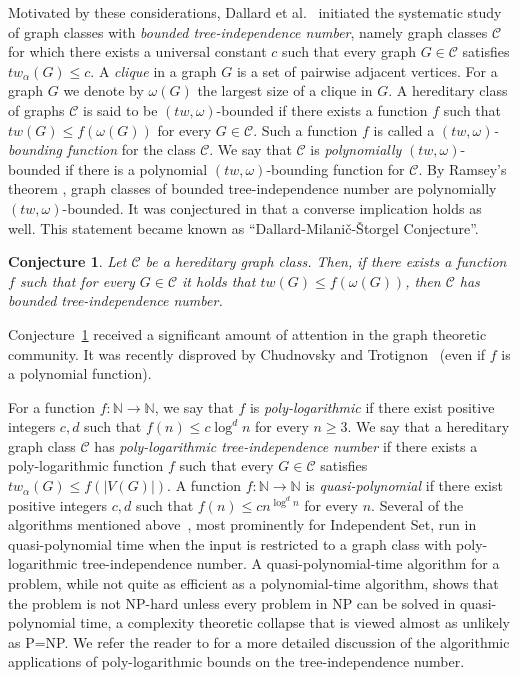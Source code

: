 \documentclass[11pt]{amsart}
\newtheorem{conjecture}{Conjecture}[section]
\newcommand{\cal}{\mathcal}
\newcommand{\tw}{tw\xspace}
\newcommand{\atw}{tw_{\alpha}\xspace}
\begin{document}
Motivated by these considerations, Dallard et al.~\cite{dms3} initiated the systematic study of graph classes with {\em bounded tree-independence number}, namely graph classes ${\cal C}$ for which there exists a universal constant $c$ such that every graph $G \in {\cal C}$ satisfies $\atw(G) \leq c$. 
A {\em clique} in a graph $G$ is a set of pairwise adjacent vertices.
For a graph $G$ we denote by $\omega(G)$ the largest size of a clique in $G$.
A hereditary class of graphs $\cal C$ is said to be
$(\tw, \omega)$-bounded if there exists a function $f$ such that
$\tw(G) \leq  f(\omega(G))$ for every  $G \in \cal C$.
Such a function $f$ is called a 
{\em $(\tw,\omega)$-bounding function} for the class $\mathcal{C}$.
We say that $\mathcal{C}$ is {\em polynomially} $(\tw,\omega)$-bounded if
there is a polynomial $(\tw,\omega)$-bounding  function for $\mathcal{C}$.
By Ramsey's theorem \cite{Ramsey}, graph classes of bounded tree-independence number are polynomially $(\tw,\omega )$-bounded. It was conjectured in \cite{dms3} that a converse implication holds as well.  This statement became known as
``Dallard-Milani\v{c}-{\v{S}}torgel Conjecture''.
%
\begin{conjecture}\label{Milanic}
  Let $\cal C$ be a hereditary graph class. Then, if there exists a function $f$ such that for every $G \in {\cal C}$ it holds that $\tw(G) \leq f(\omega(G))$, then ${\cal C}$ has bounded tree-independence number.
 \end{conjecture} 
%
Conjecture~\ref{Milanic} received a significant amount of attention in the graph theoretic community. 
It was recently disproved by Chudnovsky and Trotignon~\cite{CT} (even if $f$ is a polynomial function). 

For a function $f: \mathbb{N} \rightarrow \mathbb{N}$, we say that $f$ is {\em poly-logarithmic}
if there exist positive integers $c,d$ such that $f(n) \leq c \log^d n$ for every $n \geq 3$.
We say that a hereditary graph class $\mathcal{C}$ has 
{\em poly-logarithmic tree-independence number}
if there exists a poly-logarithmic function $f$ such that every $G \in \mathcal{C}$ satisfies
$\atw(G) \leq f(|V(G)|)$. 
A function $f:\mathbb{N} \rightarrow \mathbb{N}$ is {\em quasi-polynomial} if 
there exist positive integers $c,d$ such that $f(n) \leq c n^{\log^d n}$ for every $n$.
Several of the algorithms mentioned above~\cite{dms2,lima2024tree,Yolov}, most prominently for {\sc Independent Set}, run in quasi-polynomial time  
when the input is restricted to a graph class with poly-logarithmic  tree-independence number.
%
A quasi-polynomial-time algorithm for a problem, while not quite as efficient as a polynomial-time algorithm, shows that the problem is not NP-hard unless every problem in NP can be solved in quasi-polynomial time, a complexity theoretic collapse that is viewed almost as unlikely as P=NP. We refer the reader to \cite{TI2,sparseinduced} for a more detailed discussion of the algorithmic applications of poly-logarithmic bounds on the tree-independence number. 
%
\end{document}

